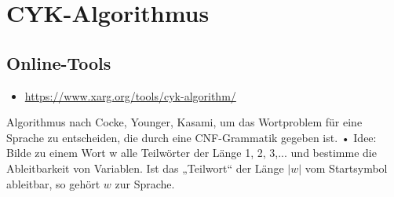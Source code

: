 \documentclass{lehramt-informatik-haupt}
\begin{document}
\chapter{CYK-Algorithmus}

\begin{liQuellen}
\item \cite[Seite 45-75]{theo:fs:2}
\item \cite[Seite 186-188]{hoffmann}
\item \cite{wiki:cyk}
\end{liQuellen}

\section{Online-Tools}

\begin{itemize}
\item \url{https://www.xarg.org/tools/cyk-algorithm/}
\end{itemize}

Algorithmus nach Cocke, Younger, Kasami, um das Wortproblem für
eine Sprache zu entscheiden, die durch eine CNF-Grammatik
gegeben ist.
• Idee:
Bilde zu einem Wort w alle Teilwörter der Länge 1, 2, 3,... und
bestimme die Ableitbarkeit von Variablen.
Ist das „Teilwort“ der Länge $|w|$ vom Startsymbol ableitbar, so gehört
$w$ zur Sprache.

\literatur
\end{document}

